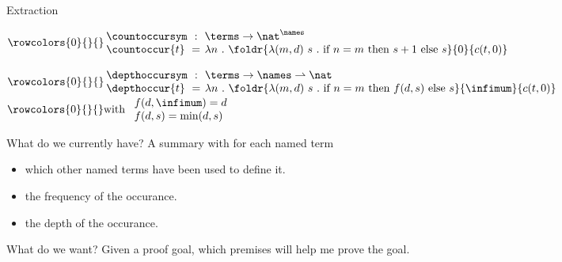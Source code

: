 \begin{frame}{Extraction}
	\begin{definition}
	$
	\rowcolors{0}{}{}
	\arraycolsep=0.2em
	\begin{array}{lcl}
		\countoccursym & : & \terms \rightarrow \nat^{\names} \\
		\countoccur{t} & = & \lambda n ~.~ \foldr{\lambda (m, d)~s ~.~ \text{if~} n = m \text{~then~} s+1 \text{~else~} s}{0}{c(t, 0)}
	\end{array}
	$\\
	\end{definition}
	\bigskip
	\begin{definition}[Depth of symbols $\depthoccursym$]
	$
		\rowcolors{0}{}{}
		\arraycolsep=0.2em
		\begin{array}{lcl}
		\depthoccursym & : & \terms \rightarrow \names \rightharpoonup \nat \\
		\depthoccur{t} & = & \lambda n ~.~ \foldr{\lambda (m, d)~s ~.~ \text{if~} n = m \text{~then~} f(d, s) \text{~else~} s}{\infimum}{c(t, 0)} \\
		\end{array}
	$\\
	\bigskip
	$
		\rowcolors{0}{}{}
		\text{with~} \begin{array}{l}
			f(d, \infimum) = d \\
			f(d, s) = \text{min}(d, s) \\
		\end{array}
	$
	\end{definition}
\end{frame}

\begin{frame}{What do we currently have?}
	A summary with for each named term
	\begin{itemize}
		\item which other named terms have been used to define it.
		\item the frequency of the occurance.
		\item the depth of the occurance.
	\end{itemize}
\end{frame}

\begin{frame}{What do we want?}
	Given a proof goal, which premises will help me prove the goal.
\end{frame}

